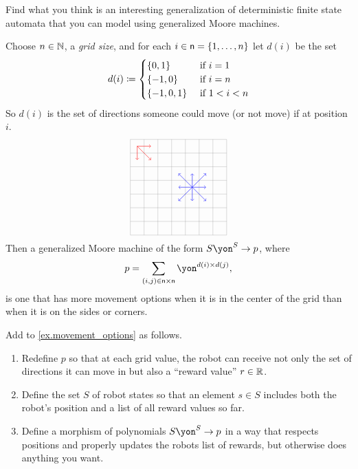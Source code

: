 \documentclass[Book-Poly]{subfiles}
\begin{document}
\begin{exercise}
Find what you think is an interesting generalization of deterministic finite state automata that you can model using generalized Moore machines.
\end{exercise}

\begin{example}\label{ex.movement_options}
Choose $n\in\mathbb{N}$, a \emph{grid size}, and for each $i\in\mathsf{n}=\{1,\ldots,n\}$ let $d(i)$ be the set
\[
	d(i)\coloneqq
	\begin{cases}
		\{0,1\}&\textnormal{ if }i=1\\
		\{-1,0\}&\textnormal{ if }i=n\\
		\{-1,0,1\}&\textnormal{ if } 1<i<n
	\end{cases}
\]
So $d(i)$ is the set of directions someone could move (or not move) if at position $i$.
\[
\begin{tikzpicture}[scale=.5]
  \draw[step=1cm,gray,very thin] (-3,-3) grid (4,4);
	\draw[->, red ] (-2.5,3.5) -- (-1.5, 3.5);
	\draw[->, red ] (-2.5,3.5) -- (-1.5, 2.5);
	\draw[->, red ] (-2.5,3.5) -- (-2.5, 2.5);
	\draw[->, blue] (1.5, 0.5) -- (0.5, 0.5);
	\draw[->, blue] (1.5, 0.5) -- (2.5, 0.5);
	\draw[->, blue] (1.5, 0.5) -- (1.5, 1.5);
	\draw[->, blue] (1.5, 0.5) -- (1.5,-0.5);
	\draw[->, blue] (1.5, 0.5) -- (0.5, 1.5);
	\draw[->, blue] (1.5, 0.5) -- (0.5,-0.5);
	\draw[->, blue] (1.5, 0.5) -- (2.5, 1.5);
	\draw[->, blue] (1.5, 0.5) -- (2.5,-0.5);
\end{tikzpicture}
\]
Then a generalized Moore machine of the form $S\yon^S\to p$, where
\[
p= \sum_{(i,j)\in\ord{n}\times\ord{n}}\yon^{d(i)\times d(j)},
\]
is one that has more movement options when it is in the center of the grid than when it is on the sides or corners.
\end{example}

\begin{exercise}
Add to \cref{ex.movement_options} as follows.
\begin{enumerate}
	\item Redefine $p$ so that at each grid value, the robot can receive not only the set of directions it can move in but also a ``reward value'' $r\in\mathbb{R}$. 
	\item Define the set $S$ of robot states so that an element $s\in S$ includes both the robot's position and a list of all reward values so far.
	\item Define a morphism of polynomials $S\yon^S\to p$ in a way that respects positions and properly updates the robots list of rewards, but otherwise does anything you want.
\qedhere
\end{enumerate}
\end{exercise}
\end{document}

